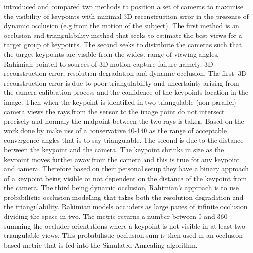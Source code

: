 \citet{rahimian2016optimal} introduced and compared two methods to position a set of cameras to maximise the visibility of keypoints with minimal 3D reconstruction error in the presence of dynamic occlusion (e.g from the motion of the subject). The first method is an occlusion and triangulability method that seeks to estimate the best views for a target group of keypoints. The second seeks to distribute the cameras such that the target keypoints are visible  from the widest range of viewing angles.
Rahimian pointed to sources of 3D motion capture failure namely: 3D reconstruction error, resolution degradation and dynamic occlusion.
The first, 3D reconstruction error is due to poor triangulability and uncertainty arising from the camera calibration process and the confidence of the keypoints location in the image. Then when the keypoint is identified in two triangulable (non-parallel) camera views the rays from the sensor to the image point do not intersect precisely and normaly the midpoint between the two rays is taken. Based on the work done by \citet{olague2002optimal} \citet{rahimian2016optimal} make use of a conservative 40-140 as the range of acceptable convergence angles that is to say triangulable.
The second is due to the distance between the keypoint and the camera. The keypoint shrinks in size as the keypoint moves further away from the camera and this is true for any keypoint and camera. Therefore based on their personal setup they have a binary approach of a keypoint being visible or not dependent on the distance of the keypoint from the camera.
The third being dynamic occlusion, Rahimian's approach is to use probabilistic occlusion modelling that takes both the resolution degradation and the triangulability. Rahimian models occluders as large panes of infinite occlusion dividing the space in two. The metric returns a number between 0 and 360 summing the occluder orientations where a keypoint is not visible in at least two triangulable views. This probabilistic occlusion sum is then used in an occlusion based metric that is fed into the Simulated Annealing algorithm.
